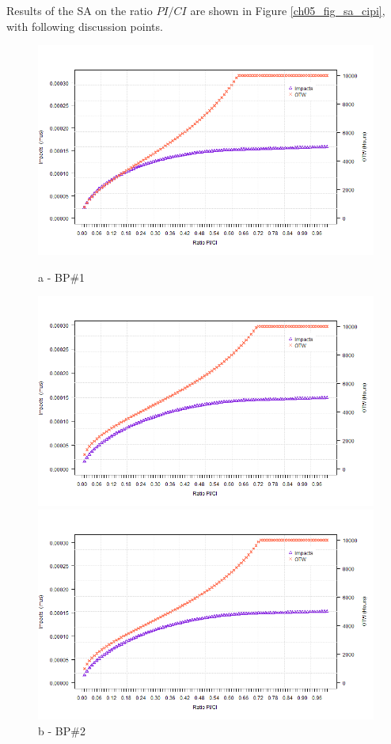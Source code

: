 Results of the SA on the ratio $PI/CI$ are shown in Figure \ref{ch05_fig_sa_cipi}, with following discussion points.


\begin{figure}[!htb]
	\begin{minipage}[b]{0.5\linewidth}
		\centering
		\includegraphics[width=\textwidth]{figures/ch05_fig_sacipi_pump1}
		\caption*{a - BP\#1}
	\end{minipage}
	\hspace{0.05cm}
	\begin{minipage}[b]{0.5\linewidth}
		\centering
		\includegraphics[width=\textwidth]{figures/ch05_fig_sacipi_pump2}
		\caption*{b - BP\#2}
	\end{minipage}
	\hspace{0.05cm}
	\begin{minipage}[b]{0.5\linewidth}
		\centering
		\includegraphics[width=\textwidth]{figures/ch05_fig_sacipi_pump3}

\end{minipage}
\end{figure}
